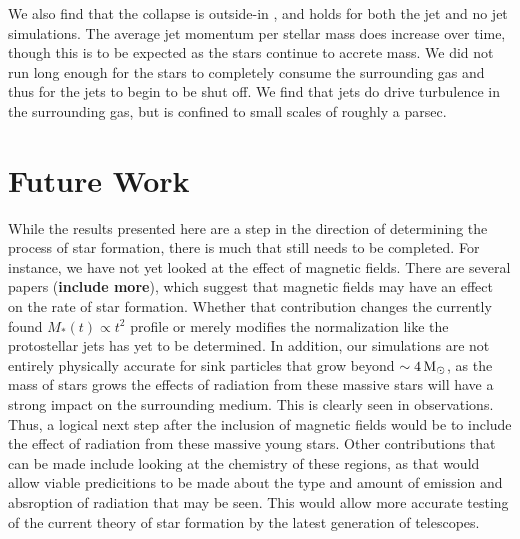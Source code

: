 \documentclass[../dissertation.tex]{subfiles}
\begin{document}
We also find that the collapse is outside-in  \citep{2017MNRAS.465.1316M}, and holds for both the jet and no jet simulations.
The average jet momentum per stellar mass does increase over time, though this is to be expected as the stars continue to accrete mass.
We did not run long enough for the stars to completely consume the surrounding gas and thus for the jets to begin to be shut off.
We find that jets do drive turbulence in the surrounding gas, but is confined to small scales of roughly a parsec.

\section{Future Work}
While the results presented here are a step in the direction of determining the process of star formation, there is much that still needs to be completed. 
For instance, we have not yet looked at the effect of magnetic fields. 
There are several papers \citet{2017ApJ...838...40M} ({\bf include more}), which suggest that magnetic fields may have an effect on the rate of star formation. 
Whether that contribution changes the currently found $M_*(t) \propto t^2$ profile or merely modifies the normalization like the protostellar jets has yet to be determined. 
In addition, our simulations are not entirely physically accurate for sink particles that grow beyond $\sim 4 {\,\rm M}_\odot$, as the mass of stars grows the effects of radiation from these massive stars will have a strong impact on the surrounding medium. 
This is clearly seen in observations. Thus, a logical next step after the inclusion of magnetic fields would be to include the effect of radiation from these massive young stars. 
Other contributions that can be made include looking at the chemistry of these regions, as that would allow viable predicitions to be made about the type and amount of emission and absroption of radiation that may be seen. 
This would allow more accurate testing of the current theory of star formation by the latest generation of telescopes.
\end{document}
